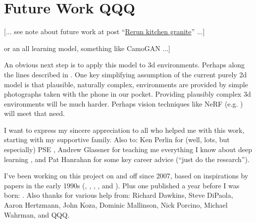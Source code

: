 \documentclass[acmtog]{acmart}
\begin{document}

\section{Future Work QQQ}
[... see note about future work at post “\href{https://cwreynolds.github.io/TexSyn/#20221106}{Rerun kitchen granite}” ...]
\par
[... propose a crowd sourced user study of camouflage quality ... could be based on time to find ... like the interactive web games of \href{https://www.visual-ecology.com/2020/10/06/martin-stevens/}{Martin Stevens} nuthatch egg? ...] 
\par
[... currently a “mixed paradigm” model using both evolution and learning ... (maybe note these typically co-occur in nature  \cite{valiant_probably_2013}) ... propose an all-evolution model with evolved detectors for predators [... perhaps like the work of \href{https://people.wgtn.ac.nz/Mengjie.Zhang}{Mengjie Zhang} or his students like \href{https://yingbi92.github.io/homepage/}{Ying Bi}? find a representative paper to cite, perhaps coauthored by them ...] or an all learning model, something like CamoGAN \cite{talas_camogan_2020} ...]
\par
An obvious next step is to apply this model to 3d environments. Perhaps along the lines described in \citet{miller_color_2022}. One key simplifying assumption of the current purely 2d model is that plausible, naturally complex, environments are provided by simple photographs taken with the phone in our pocket. Providing plausibly complex 3d environments will be much harder. Perhaps vision techniques like NeRF (e.g. \cite{gao_nerf_2022}) will meet that need.
\par


\begin{acks}
I want to express my sincere appreciation to all who helped me with this work, starting with my supportive family. Also to: Ken Perlin for (well, lots, but especially) PSE \cite{perlin_image_1985}, Andrew Glassner for teaching me everything I know about deep learning \cite{glassner_deep_2021}, and Pat Hanrahan for some key career advice (“just do the research”).
\par
I've been working on this project on and off since 2007, based on inspirations by papers in the early 1990s (\citet{witkin_reaction_1991}, \citet{turk_generating_1991}, \citet{angeline_competitive_1993}, \citet{sims_artificial_1991}, and \citet{sims_evolving_1994}). Plus one published a year before I was born: \citet{turing_chemical_1952}.
Also thanks for various help from:
Richard Dawkins,
Steve DiPaola,
Aaron Hertzmann,
John Koza,
Dominic Mallinson,
Nick Porcino,
Michael Wahrman, 
and
QQQ.

\end{acks}
\end{document}
